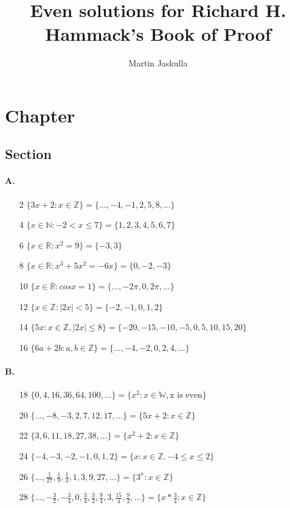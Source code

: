 \documentclass{article}
\title{Even solutions for Richard H. Hammack's Book of Proof}
\author{Martin Jaskulla}
\begin{document}
\maketitle
\section{Chapter}
\subsection{Section}

\paragraph{A.}
\begin{enumerate}
    \item [2] $\{3x+2:x \in \mathbb{Z} \} = \{...,-4,-1,2,5,8,...\}$
    \item [4] $\{x \in \mathbb{N}: -2 < x \leq 7 \} =\{1,2,3,4,5,6,7\}$
    \item [6] $\{x \in \mathbb{R}: x^2=9 \} =\{-3,3\}$
    \item [8] $\{x \in \mathbb{R}:x^3+5x^2=-6x \} =\{0,-2,-3\}$
    \item [10] $\{x \in \mathbb{R}: cos x = 1 \} =\{...,-2\pi,0,2\pi,...\}$
    \item [12] $\{x \in \mathbb{Z}: |2x|<5 \} =\{-2,-1,0,1,2\}$
    \item [14] $\{5x: x \in \mathbb{Z}, |2x| \leq8 \} =\{-20,-15,-10,-5,0,5,10,15,20\}$
    \item [16] $\{6a+2b: a,b \in \mathbb{Z} \} =\{...,-4,-2,0,2,4,...\}$
\end{enumerate}

\paragraph{B.}
\begin{enumerate}
    \item [18] $\{0,4,16,36,64,100,...\} = \{x^2: x \in \mathbb{W}, \text{x is even}\}$
    \item [20] $\{...,-8,-3,2,7,12,17,...\} = \{5x+2: x \in \mathbb{Z}\}$
    \item [22] $\{3,6,11,18,27,38,...\} = \{x^2+2:x\in \mathbb{Z}\}$
    \item [24] $\{-4,-3,-2,-1,0,1,2\} = \{ x: x\in \mathbb{Z}, -4 \leq x \leq 2\}$
    \item [26] $\{...,\frac{1}{27},\frac{1}{9},\frac{1}{3},1,3,9,27,...\} = \{ 3^x: x \in \mathbb{Z}\}$
    \item [28] $\{...,-\frac{3}{2},-\frac{3}{4},0,\frac{3}{4},\frac{3}{2},\frac{9}{4},3,\frac{15}{4},\frac{9}{2},...\} =\{x * \frac{3}{4}:x \in \mathbb{Z}\}$
\end{enumerate}
\end{document}
